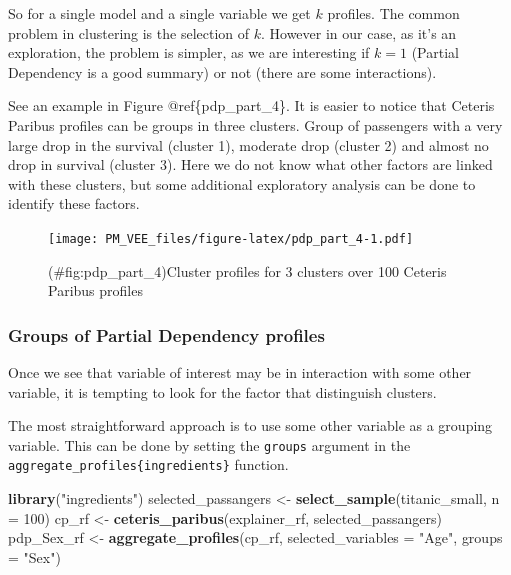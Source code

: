 \documentclass[]{krantz}
\newenvironment{Shaded}{\begin{snugshade}}{\end{snugshade}}
\newcommand{\DataTypeTok}[1]{\textcolor[rgb]{0.13,0.29,0.53}{#1}}
\newcommand{\DecValTok}[1]{\textcolor[rgb]{0.00,0.00,0.81}{#1}}
\newcommand{\KeywordTok}[1]{\textcolor[rgb]{0.13,0.29,0.53}{\textbf{#1}}}
\newcommand{\NormalTok}[1]{#1}
\newcommand{\StringTok}[1]{\textcolor[rgb]{0.31,0.60,0.02}{#1}}
\theoremstyle{definition}
\theoremstyle{definition}
\theoremstyle{definition}
\theoremstyle{remark}
\begin{document}
So for a single model and a single variable we get \(k\) profiles. The
common problem in clustering is the selection of \(k\). However in our
case, as it's an exploration, the problem is simpler, as we are
interesting if \(k=1\) (Partial Dependency is a good summary) or not
(there are some interactions).

See an example in Figure @ref\{pdp\_part\_4\}. It is easier to notice
that Ceteris Paribus profiles can be groups in three clusters. Group of
passengers with a very large drop in the survival (cluster 1), moderate
drop (cluster 2) and almost no drop in survival (cluster 3). Here we do
not know what other factors are linked with these clusters, but some
additional exploratory analysis can be done to identify these factors.

\begin{figure}
\centering
\texttt{[image: PM\_VEE\_files/figure-latex/pdp\_part\_4-1.pdf]}
\caption{(\#fig:pdp\_part\_4)Cluster profiles for 3 clusters over 100
Ceteris Paribus profiles}
\end{figure}

\hypertarget{groups-of-partial-dependency-profiles}{%
\subsubsection{Groups of Partial Dependency
profiles}\label{groups-of-partial-dependency-profiles}}

Once we see that variable of interest may be in interaction with some
other variable, it is tempting to look for the factor that distinguish
clusters.

The most straightforward approach is to use some other variable as a
grouping variable. This can be done by setting the \texttt{groups}
argument in the \texttt{aggregate\_profiles\{ingredients\}} function.

\begin{Shaded}
\begin{Highlighting}[]
\KeywordTok{library}\NormalTok{(}\StringTok{"ingredients"}\NormalTok{)}
\NormalTok{selected_passangers <-}\StringTok{ }\KeywordTok{select_sample}\NormalTok{(titanic_small, }\DataTypeTok{n =} \DecValTok{100}\NormalTok{)}
\NormalTok{cp_rf <-}\StringTok{ }\KeywordTok{ceteris_paribus}\NormalTok{(explainer_rf, selected_passangers)}
\NormalTok{pdp_Sex_rf <-}\StringTok{ }\KeywordTok{aggregate_profiles}\NormalTok{(cp_rf, }\DataTypeTok{selected_variables =} \StringTok{"Age"}\NormalTok{,}
                \DataTypeTok{groups =} \StringTok{"Sex"}\NormalTok{)}
\end{Highlighting}
\end{Shaded}
\end{document}
